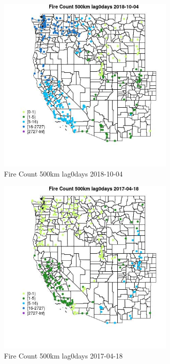 \begin{figure} 
\centering  
\includegraphics[width=0.77\textwidth]{Code_Outputs/Report_ML_input_PM25_Step4_part_f_de_duplicated_aveswNAs_MapObsFire_Count_500km_lag0days2018-10-04.jpg} 
\caption{\label{fig:Report_ML_input_PM25_Step4_part_f_de_duplicated_aveswNAsMapObsFire_Count_500km_lag0days2018-10-04}Fire Count 500km lag0days 2018-10-04} 
\end{figure} 
 

\clearpage 

\begin{figure} 
\centering  
\includegraphics[width=0.77\textwidth]{Code_Outputs/Report_ML_input_PM25_Step4_part_f_de_duplicated_aveswNAs_MapObsFire_Count_500km_lag0days2017-04-18.jpg} 
\caption{\label{fig:Report_ML_input_PM25_Step4_part_f_de_duplicated_aveswNAsMapObsFire_Count_500km_lag0days2017-04-18}Fire Count 500km lag0days 2017-04-18} 
\end{figure} 
 

